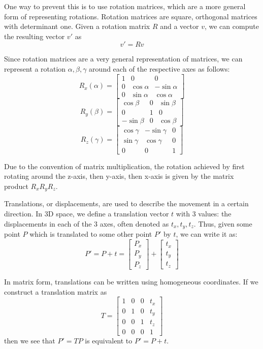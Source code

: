 \documentclass[a4paper, 12pt]{article}
\begin{document}
One way to prevent this is to use rotation matrices, which are a more general form of representing rotations. Rotation matrices are square, orthogonal matrices with determinant one. Given a rotation matrix $R$ and a vector $v$, we can compute the resulting vector $v'$ as
\[v' = Rv\]

Since rotation matrices are a very general representation of matrices, we can represent a rotation $\alpha, \beta, \gamma$ around each of the respective axes as follows:
\[R_x(\alpha) = \begin{bmatrix}1 & 0 & 0\\ 0 &\cos\alpha &-\sin\alpha \\ 0 &\sin\alpha &\cos\alpha \end{bmatrix}\]
\[R_y(\beta) = \begin{bmatrix}\cos\beta & 0 & \sin\beta \\ 0 & 1 & 0 \\ -\sin\beta & 0 &\cos\beta \end{bmatrix}\]
\[R_z(\gamma) = \begin{bmatrix}\cos \gamma & -\sin\gamma &0 \\ \sin\gamma &\cos\gamma & 0 \\ 0 & 0 & 1 \end{bmatrix}\]

Due to the convention of matrix multiplication, the rotation achieved by first rotating around the z-axis, then y-axis, then x-axis is given by the matrix product $R_xR_yR_z$.

Translations, or displacements, are used to describe the movement in a certain direction. In 3D space, we define a translation vector $t$ with 3 values: the displacements in each of the 3 axes, often denoted as $t_x, t_y, t_z$. Thus, given some point $P$ which is translated to some other point $P'$ by $t$, we can write it as:
\[ P' = P + t = \begin{bmatrix}P_x\\P_y\\P_z\end{bmatrix} + \begin{bmatrix}t_x\\t_y\\t_z\end{bmatrix}\]

In matrix form, translations can be written using homogeneous coordinates. If we construct a translation matrix as
\[ T = \begin{bmatrix}
1 & 0 & 0 & t_x \\0 & 1 & 0 & t_y \\0 & 0 & 1 & t_z \\ 0 & 0 & 0 & 1
\end{bmatrix}\]
then we see that $P'=TP$ is equivalent to $P' = P+t$.
\end{document}
